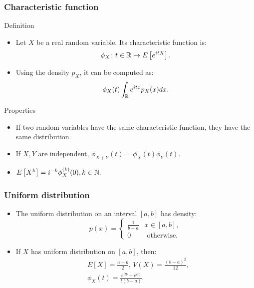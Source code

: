 \documentclass[main.tex]{subfiles}
\begin{document}
\begin{frame}
    \frametitle{Characteristic function}
    \begin{block}{Definition}
       \begin{itemize}
        \item<+-> Let $X$ be a real random variable. Its characteristic function is:
        \begin{equation}
            \phi_X \colon t \in \mathbb{R} \mapsto E\left[ e^{i t X} \right].
        \end{equation}
        \item<+-> Using the density $p_X$, it can be computed as:
        \begin{equation}
            \phi_X(t)  \int_{\mathbb{R}} e^{i t x} p_X(x) dx.
        \end{equation}
       \end{itemize} 
    \end{block}
    \vskip -24pt
    \begin{block}{Properties}
        \begin{itemize}
            \item<+-> If two random variables have the same characteristic function, they have the same distribution.
            \item<+-> If $X,Y$ are independent, $\phi_{X+Y}(t)=\phi_X(t)\phi_Y(t).$
            \item<+-> $E\left[ X^k \right] = i^{-k} \phi_X^{(k)}(0), k \in \mathbb{N}.$
        \end{itemize}
    \end{block}
\end{frame}
\begin{frame}
    \frametitle{Uniform distribution}
\begin{itemize}
    \item<+-> The uniform distribution on an interval $[a,b]$ has density:
    \begin{equation}
        p(x)= \begin{cases}
            \frac{1}{b-a} & x \in [a,b], \\
            0 & \text{ otherwise.}
        \end{cases}
    \end{equation}
    \item<+-> If $X$ has uniform distribution on $[a,b]$, then:
    \begin{equation}
        \begin{split}
            &E\left[ X \right] = \frac{a+b}{2}, \, V(X) = \frac{(b-a)^2}{12}, \\
            &\phi_X(t) = \frac{e^{itb}-e^{ita}}{t(b-a)}.
        \end{split}
    \end{equation}
\end{itemize}
\end{frame}
\end{document}
